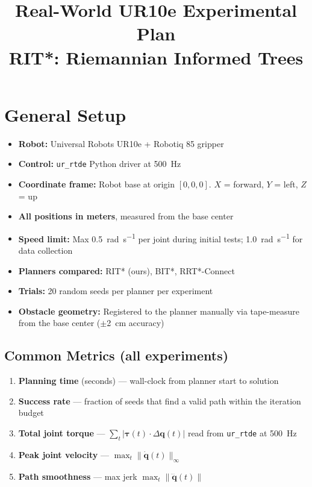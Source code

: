 \documentclass[11pt]{article}
\title{Real-World UR10e Experimental Plan\\[0.3em]
\large RIT*: Riemannian Informed Trees}
\author{}
\date{}
\begin{document}
\maketitle

\section*{General Setup}

\begin{itemize}[itemsep=2pt]
  \item \textbf{Robot:} Universal Robots UR10e + Robotiq 85 gripper
  \item \textbf{Control:} \texttt{ur\_rtde} Python driver at \SI{500}{\hertz}
  \item \textbf{Coordinate frame:} Robot base at origin $[0,0,0]$. $X$ = forward, $Y$ = left, $Z$ = up
  \item \textbf{All positions in meters}, measured from the base center
  \item \textbf{Speed limit:} Max \SI{0.5}{\radian\per\second} per joint during initial tests; \SI{1.0}{\radian\per\second} for data collection
  \item \textbf{Planners compared:} RIT* (ours), BIT*, RRT*-Connect
  \item \textbf{Trials:} 20 random seeds per planner per experiment
  \item \textbf{Obstacle geometry:} Registered to the planner manually via tape-measure from the base center ($\pm$\SI{2}{\centi\meter} accuracy)
\end{itemize}

\subsection*{Common Metrics (all experiments)}

\begin{enumerate}[itemsep=2pt]
  \item \textbf{Planning time} (seconds) --- wall-clock from planner start to solution
  \item \textbf{Success rate} --- fraction of seeds that find a valid path within the iteration budget
  \item \textbf{Total joint torque} --- $\sum_{t} |\boldsymbol{\tau}(t) \cdot \Delta\mathbf{q}(t)|$ read from \texttt{ur\_rtde} at \SI{500}{\hertz}
  \item \textbf{Peak joint velocity} --- $\max_t \|\dot{\mathbf{q}}(t)\|_\infty$
  \item \textbf{Path smoothness} --- max jerk $\max_t \|\dddot{\mathbf{q}}(t)\|$
\end{enumerate}
\end{document}
